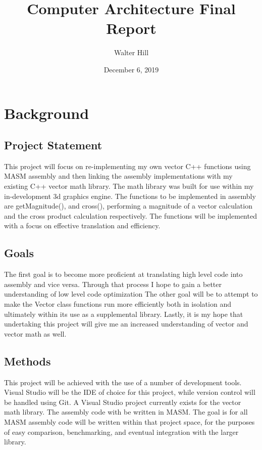 \documentclass[12pt]{article}
\title{Computer Architecture Final Report}
\author{Walter Hill}
\date{December 6, 2019}
\begin{document}
\maketitle

\section{Background}


\subsection{Project Statement}\label{What}
\noindent This project will focus on re-implementing my own vector C++ functions using MASM assembly and then linking the assembly implementations with my existing C++ vector math library.  The math library was built for use within my in-development 3d graphics engine. The functions to be implemented in assembly are getMagnitude(), and cross(), performing a magnitude of a vector calculation and the cross product calculation respectively. The functions will be implemented with a focus on effective translation and efficiency.

\subsection{Goals}\label{Why}
\noindent The first goal is to become more proficient at translating high level code into assembly and vice versa. Through that process I hope to gain a better understanding of low level code optimization The other goal will be to attempt to make the Vector class functions run more efficiently both in isolation and ultimately within its use as a supplemental library. Lastly, it is my hope that undertaking this project will give me an increased understanding of vector and vector math as well. 

\subsection{Methods}\label{How}
\noindent This project will be achieved with the use of a number of development tools. Visual Studio will be the IDE of choice for this project, while version control will be handled using Git. A Visual Studio project currently exists for the vector math library. The assembly code with be written in MASM. The goal is for all MASM assembly code will be written within that project space, for the purposes of easy comparison, benchmarking, and eventual integration with the larger library. 
\end{document}
